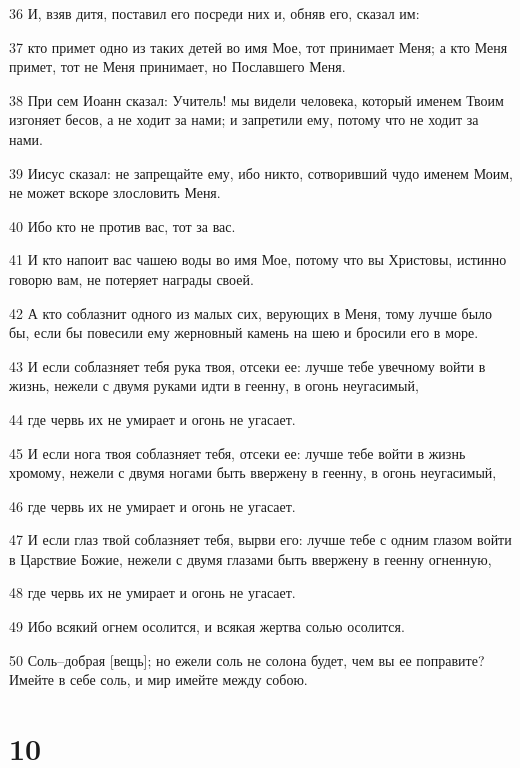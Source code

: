 \par 36 И, взяв дитя, поставил его посреди них и, обняв его, сказал им:
\par 37 кто примет одно из таких детей во имя Мое, тот принимает Меня; а кто Меня примет, тот не Меня принимает, но Пославшего Меня.
\par 38 При сем Иоанн сказал: Учитель! мы видели человека, который именем Твоим изгоняет бесов, а не ходит за нами; и запретили ему, потому что не ходит за нами.
\par 39 Иисус сказал: не запрещайте ему, ибо никто, сотворивший чудо именем Моим, не может вскоре злословить Меня.
\par 40 Ибо кто не против вас, тот за вас.
\par 41 И кто напоит вас чашею воды во имя Мое, потому что вы Христовы, истинно говорю вам, не потеряет награды своей.
\par 42 А кто соблазнит одного из малых сих, верующих в Меня, тому лучше было бы, если бы повесили ему жерновный камень на шею и бросили его в море.
\par 43 И если соблазняет тебя рука твоя, отсеки ее: лучше тебе увечному войти в жизнь, нежели с двумя руками идти в геенну, в огонь неугасимый,
\par 44 где червь их не умирает и огонь не угасает.
\par 45 И если нога твоя соблазняет тебя, отсеки ее: лучше тебе войти в жизнь хромому, нежели с двумя ногами быть ввержену в геенну, в огонь неугасимый,
\par 46 где червь их не умирает и огонь не угасает.
\par 47 И если глаз твой соблазняет тебя, вырви его: лучше тебе с одним глазом войти в Царствие Божие, нежели с двумя глазами быть ввержену в геенну огненную,
\par 48 где червь их не умирает и огонь не угасает.
\par 49 Ибо всякий огнем осолится, и всякая жертва солью осолится.
\par 50 Соль--добрая [вещь]; но ежели соль не солона будет, чем вы ее поправите? Имейте в себе соль, и мир имейте между собою.

\chapter{10}

